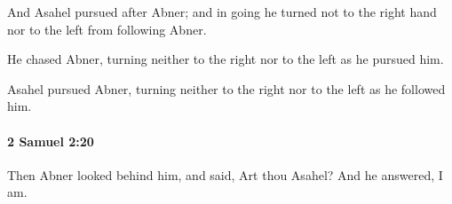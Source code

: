 			\begin{versebox}
					\item[BHS] 
					\item[ASV] And Asahel pursued after Abner; and in going he turned not to the right hand nor to the left from following Abner.
					\item[NIV] He chased Abner, turning neither to the right nor to the left as he pursued him.
					\item[NRSV] Asahel pursued Abner, turning neither to the right nor to the left as he followed him.
			\end{versebox}

		\paragraph{2 Samuel 2:20} %
			\label{2SAMUEL-2-20}

			Then Abner looked behind him, and said, Art thou Asahel? And he answered, I am.

